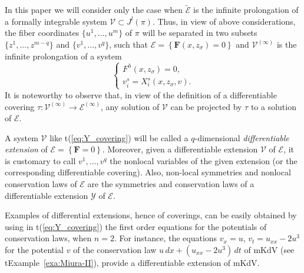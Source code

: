 \documentclass[12pt,english]{elsarticle}
\theoremstyle{plain}
\theoremstyle{plain}
\theoremstyle{remark}
\theoremstyle{plain}
\theoremstyle{definition}
\theoremstyle{definition}
\begin{document}
In this paper we will consider only the case when
$\tilde{\mathcal{E}}$ is the infinite prolongation of a formally integrable
system $\mathcal{V}\subset J^{l}(\pi )$. Thus, in view of above considerations,
the fiber coordinates $\{u^{1},...,u^{m}\}$ of $\pi $ will be separated
in two subsets $\{z^{1},...,z^{m-q}\}$ and $\{v^{1},...,v^{q}\}$, such
that $\mathcal{E}=\left \{ \mathbf{F}(x,z_{\sigma})=0\right \} $ and
$\mathcal{V}^{(\infty )}$ is the infinite prolongation of a system
%
\begin{equation}
\left \{
%
\begin{array}{l}
F^{h}(x,z_{\sigma})=0,
\\
v_{i}^{s}=X_{i}^{s}(x,z_{\sigma},v).
\end{array}
%
\right .
\label{eq:Y_covering}
\end{equation}
%
It is noteworthy to observe that, in view of the definition of a differentiable
covering
$\tau :\mathcal{V}^{(\infty )}\longrightarrow \mathcal{E}^{(\infty )}$,
any solution of $\mathcal{V}$ can be projected by $\tau $ to a solution
of $\mathcal{E}$.

A system $\mathcal{V}$ like t{(\ref{eq:Y_covering})} will be called a
$q$-dimensional \textsl{differentiable extension} of
$\mathcal{E}=\left \{ \mathbf{F}=0\right \} $. Moreover, given a differentiable
extension $\mathcal{V}$ of $\mathcal{E}$, it is customary to call
$v^{1},...,v^{q}$ the nonlocal variables of the given extension (or the
corresponding differentiable covering). Also, non-local symmetries and
nonlocal conservation laws of $\mathcal{E}$ are the symmetries and conservation
laws of a differentiable extension $\mathcal{Y}$ of $\mathcal{E}$.

Examples of differential extensions, hence of coverings, can be easily
obtained by using in t{(\ref{eq:Y_covering})} the first order equations for
the potentials of conservation laws, when $n=2$. For instance, the equations
$v_{x}=u$, $v_{t}=u_{xx}-2u^{3}$ for the potential $v$ of the conservation
law $u\,dx+(u_{xx}-2u^{3})\,dt$ of mKdV (see t{Example~\ref{exa:Miura-II}}), provide a differentiable extension of mKdV.
\end{document}
